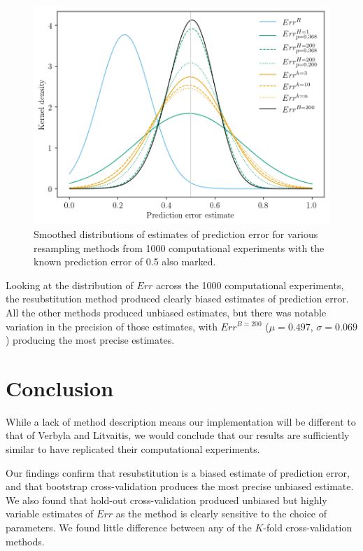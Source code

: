 \begin{figure}[tbh]
\centering
\includegraphics[width=\textwidth]{../code/resampling-results.png}
\caption{Smoothed distributions of estimates of prediction error for various resampling methods from 1000 computational experiments with the known prediction error of 0.5 also marked.}
\label{fig:smoothed-distributions}
\end{figure}

\bigskip

Looking at the distribution of $Err$ across the 1000 computational
experiments, the resubstitution method produced clearly biased estimates
of prediction error. All the other methods produced unbiased estimates,
but there was notable variation in the precision of those estimates,
with $Err^{B=200}$ ($\mu=0.497$, $\sigma=0.069$) producing the most
precise estimates.

\section{Conclusion}

While a lack of method description means our implementation will be
different to that of Verbyla and Litvaitis\supercite{verbyla-1989}, we would
conclude that our results are sufficiently similar to have replicated
their computational experiments.

\bigskip

Our findings confirm that resubstitution is a biased estimate of
prediction error, and that bootstrap cross-validation produces the most
precise unbiased estimate. We also found that hold-out cross-validation
produced unbiased but highly variable estimates of $Err$ as the method
is clearly sensitive to the choice of parameters. We found little
difference between any of the $K$-fold cross-validation methods.

